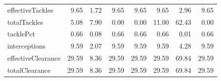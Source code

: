 \begin{table}[H]
\begin{tabular}{lrrrrrrr}
effectiveTackles & 9.65 & 1.72 & 9.65 & 9.65 & 9.65 & 2.96 & 9.65 \\
totalTackles & 5.08 & 7.90 & 0.00 & 0.00 & 11.00 & 62.43 & 0.00 \\
tacklePct & 0.66 & 0.08 & 0.66 & 0.66 & 0.66 & 0.01 & 0.66 \\
interceptions & 9.59 & 2.07 & 9.59 & 9.59 & 9.59 & 4.28 & 9.59 \\
effectiveClearance & 29.59 & 8.36 & 29.59 & 29.59 & 29.59 & 69.84 & 29.59 \\
totalClearance & 29.59 & 8.36 & 29.59 & 29.59 & 29.59 & 69.84 & 29.59 \\
\hline
\end{tabular}
\end{table}

